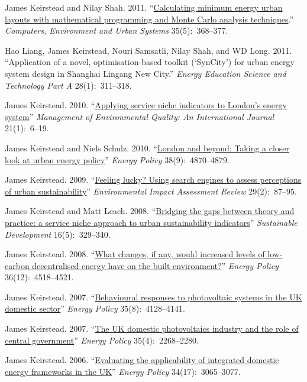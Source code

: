 \documentclass[11pt,a4paper]{article}
\begin{document}
\ind James Keirstead and Nilay Shah. 2011. ``\href{http://dx.doi.org/10.1016/j.compenvurbsys.2010.12.005}{Calculating minimum energy urban layouts with mathematical programming and Monte Carlo analysis techniques}.'' \emph{Computers, Environment and Urban Systems} 35(5):~368--377. 

\ind Hao Liang, James Keirstead, Nouri Samsatli, Nilay Shah, and WD Long. 2011. ``Application of a novel, optimisation-based toolkit (`SynCity') for urban energy system design in Shanghai Lingang New City.'' \emph{Energy Education Science and Technology Part A} 28(1):~311--318.

\ind James Keirstead. 2010. ``\href{http://dx.doi.org/10.1108/14777831011010829}{Applying service niche indicators to London's energy system}'' \emph{Management of Environmental Quality: An International Journal} 21(1):~6--19.

\ind James Keirstead and Niels Schulz. 2010. ``\href{http://dx.doi.org/10.1016/j.enpol.2009.07.025}{London and beyond: Taking a closer look at urban energy policy}'' \emph{Energy Policy} 38(9):~4870--4879.

\ind James Keirstead. 2009. ``\href{http://dx.doi.org/10.1016/j.eiar.2008.09.001}{Feeling lucky? Using search engines to assess perceptions of urban sustainability}'' \emph{Environmental Impact Assessment Review} 29(2):~87--95.

\ind James Keirstead and Matt Leach.  2008. ``\href{http://dx.doi.org/10.1002/sd.349}{Bridging the gaps between theory and practice: a service niche approach to urban sustainability indicators}'' \emph{Sustainable Development} 16(5):~329--340.

\ind James Keirstead. 2008. ``\href{http://dx.doi.org/10.1016/j.enpol.2008.09.019}{What changes, if any, would increased levels of low-carbon decentralised energy have on the built environment?}'' \emph{Energy Policy} 36(12):~4518--4521.

\ind James Keirstead. 2007. ``\href{http://dx.doi.org/10.1016/j.enpol.2007.02.019}{Behavioural responses to photovoltaic systems in the UK domestic sector}'' \emph{Energy Policy} 35(8):~4128--4141.

\ind James Keirstead. 2007. ``\href{http://dx.doi.org/10.1016/j.enpol.2006.08.003}{The UK domestic photovoltaics industry and the role of central government}'' \emph{Energy Policy} 35(4):~2268--2280.

\ind James Keirstead. 2006. ``\href{http://dx.doi.org/10.1016/j.enpol.2005.06.004}{Evaluating the applicability of integrated domestic energy frameworks in the UK}'' \emph{Energy Policy} 34(17):~3065--3077.
\end{document}
